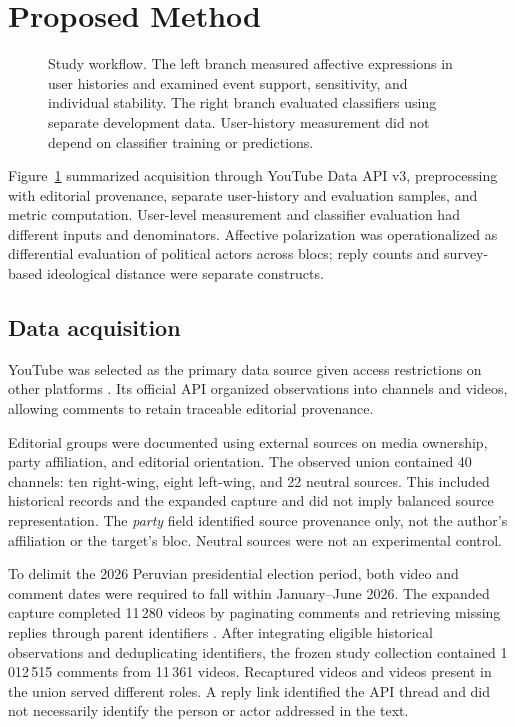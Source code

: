 \documentclass[conference,letterpaper]{IEEEtran}
\begin{document}
\section{Proposed Method}

\begin{figure}[t]
\centering
\resizebox{0.95\textwidth}{!}{}
\caption{Study workflow. The left branch measured affective expressions in user histories and examined event support, sensitivity, and individual stability. The right branch evaluated classifiers using separate development data. User-history measurement did not depend on classifier training or predictions.}
\label{fig:metodo}
\end{figure}

Figure~\ref{fig:metodo} summarized acquisition through YouTube Data API v3, preprocessing with editorial provenance, separate user-history and evaluation samples, and metric computation. User-level measurement and classifier evaluation had different inputs and denominators. Affective polarization was operationalized as differential evaluation of political actors across blocs; reply counts and survey-based ideological distance were separate constructs.

\subsection{Data acquisition}

YouTube was selected as the primary data source given access restrictions on other platforms \cite{ANTONAKAKI2021114006}. Its official API organized observations into channels and videos, allowing comments to retain traceable editorial provenance.

Editorial groups were documented using external sources on media ownership, party affiliation, and editorial orientation. The observed union contained 40 channels: ten right-wing, eight left-wing, and 22 neutral sources. This included historical records and the expanded capture and did not imply balanced source representation. The \textit{party} field identified source provenance only, not the author's affiliation or the target's bloc. Neutral sources were not an experimental control.

To delimit the 2026 Peruvian presidential election period, both video and comment dates were required to fall within January--June 2026. The expanded capture completed 11\,280 videos by paginating comments and retrieving missing replies through parent identifiers \cite{YoutubeThreads}. After integrating eligible historical observations and deduplicating identifiers, the frozen study collection contained 1\,012\,515 comments from 11\,361 videos. Recaptured videos and videos present in the union served different roles. A reply link identified the API thread and did not necessarily identify the person or actor addressed in the text.
 
\end{document}
